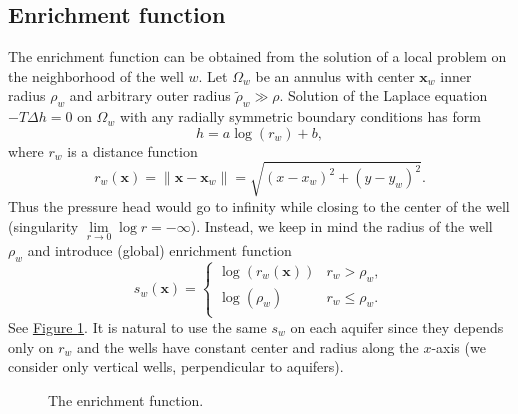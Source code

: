 \documentclass{elsarticle}
\newcommand{\fig}[1]{\hyperref[#1]{Figure \ref{#1}}}
\newcommand{\figpath}{../graphics/}
\def\vc#1{\mathbf{\boldsymbol{#1}}}     %
\newcommand{\bx}{\vc{x}}
\newcommand{\notePE}[1]{{\color{Orange} \textbf{PE: } \textit{#1}}}
\begin{document}
\subsection{Enrichment function}
The enrichment function can be obtained from the solution of a local problem on the neighborhood of the well $w$.
Let $\Omega_w$ be an annulus with center $\vc x_w$ inner radius $\rho_w$ and arbitrary outer radius $\tilde \rho_w \gg \rho$.
Solution of the Laplace equation $-T \Delta h = 0$ on $\Omega_w$ with any radially symmetric boundary conditions has form
%
\begin{equation} \label{eqn:solution_form}
  h = a \log(r_w)+b, %
\end{equation}
where $r_w$ is a distance function
\begin{equation} \label{eqn:distance}
r_w(\vc{x}) = \|\bx - \vc{x}_w\|= \sqrt{(x-x_w)^2+(y-y_w)^2}.
\end{equation}
%
Thus the pressure head would go to infinity while closing to the center of the well (singularity $\lim \limits_{r\rightarrow 0} \log r= -\infty$).
Instead, we keep in mind the radius of the well $\rho_w$ and introduce (global) enrichment function
%
\begin{equation}
\label{eqn:enrich_func}
s_w(\bx) = 
  \begin{cases}
  \log(r_w(\bx)) & r_w > \rho_w,\\
  \log(\rho_w) & r_w \le \rho_w.\\
  \end{cases}
\end{equation}
See \fig{fig:enrich_func}.
It is natural to use the same $s_w$ on each aquifer since they depends only on $r_w$ and the wells have constant center and radius along the $x$-axis
(we consider only vertical wells, perpendicular to aquifers).
%

\begin{figure}[!htb]
  \begin{center}         
    \def\svgwidth{0.5\textwidth}
    
  \end{center}
  \caption{The enrichment function.}
  \label{fig:enrich_func}
\end{figure}
\end{document}
